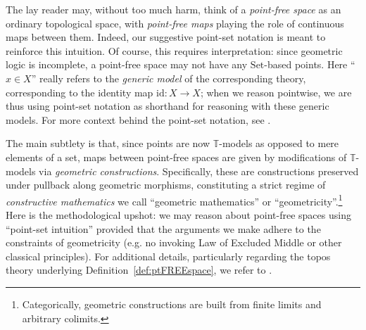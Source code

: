 \documentclass[a4paper, 11pt,reqno]{amsart}
\newcommand{\Set}{\mathrm{Set}}
\newcommand{\id}{\mathrm{id}}
\newcommand{\thT}{\mathbb{T}}
\begin{document}
The lay reader may, without too much harm, think of a {\em point-free space} as an ordinary topological space, with {\em point-free maps} playing the role of continuous maps between them. Indeed, our suggestive point-set notation is meant to reinforce this intuition. Of course, this requires interpretation: since geometric logic is incomplete, a point-free space may not have any $\Set$-based points. Here ``$x\in X$'' really refers to the {\em generic model} of the corresponding theory, corresponding to the identity map $\id\colon X\to X$; when we reason pointwise, we are thus using point-set notation as shorthand for reasoning with these generic models. For more context behind the point-set notation, see \cite[Remark 5.3]{Moerdijk}.


The main subtlety is that, since points are now $\thT$-models as opposed to mere elements of a set, maps between point-free spaces are given by modifications of $\thT$-models via {\em geometric constructions}.  Specifically, these are constructions preserved under pullback along geometric morphisms, constituting a strict regime of {\em constructive mathematics} we call  ``geometric mathematics'' or ``geometricity''.\footnote{Categorically, geometric constructions are built from finite limits and arbitrary colimits.}  Here is the methodological upshot: we may reason about point-free spaces using ``point-set intuition'' provided that the arguments we make adhere to the constraints of geometricity (e.g. no invoking Law of Excluded Middle or other classical principles). For additional details, particularly regarding the topos theory underlying Definition~\ref{def:ptFREEspace}, we refer to \cite{Vi07,VickersPtfreePtwise}.
\end{document}
